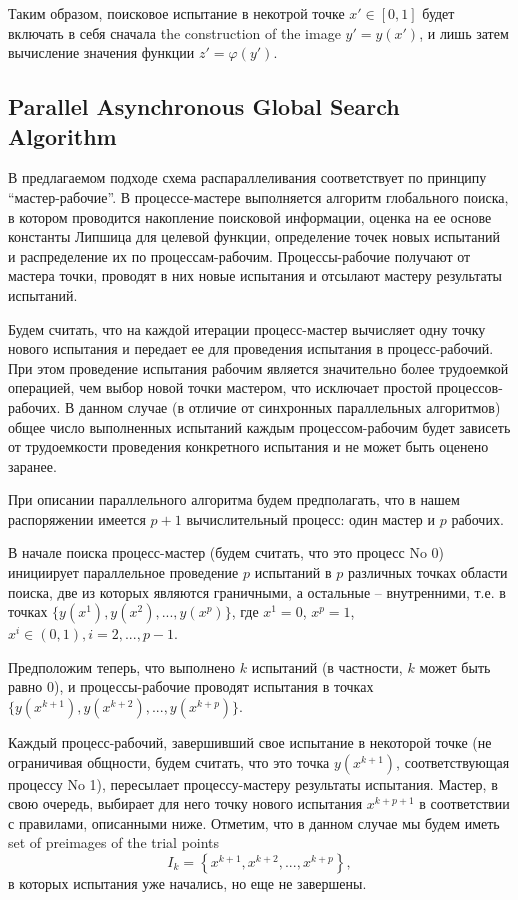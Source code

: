 \documentclass{svproc}
\begin{document}
Таким образом, поисковое испытание в некотрой точке $x'\in[0,1]$ будет включать в себя сначала the construction of the image $y'=y(x')$, и лишь затем вычисление значения функции $ z' = \varphi(y')$.

\subsection{Parallel Asynchronous Global Search Algorithm}

В предлагаемом подходе схема распараллеливания соответствует по принципу ``мастер-рабочие''. В процессе-мастере выполняется алгоритм глобального поиска, в котором проводится накопление поисковой информации, оценка на ее основе константы Липшица для целевой функции, определение точек новых испытаний и распределение их по процессам-рабочим. Процессы-рабочие получают от мастера точки, проводят в них новые испытания и отсылают мастеру результаты испытаний. 

Будем считать, что на каждой итерации процесс-мастер вычисляет одну точку нового испытания и передает ее для проведения испытания в процесс-рабочий. При этом проведение испытания рабочим является значительно более трудоемкой операцией, чем выбор новой точки мастером, что исключает простой процессов-рабочих. 
В данном случае (в отличие от синхронных параллельных алгоритмов) общее число выполненных испытаний каждым процессом-рабочим будет зависеть от трудоемкости проведения конкретного испытания и не может быть оценено заранее.

При описании параллельного алгоритма будем предполагать, что в нашем распоряжении имеется $p+1$ вычислительный процесс: один мастер и $p$ рабочих.
 
В начале поиска процесс-мастер (будем считать, что это процесс No 0) инициирует параллельное проведение $p$ испытаний в $p$ различных точках области поиска, две из которых являются граничными, а остальные -- внутренними, т.е. в точках $\{y(x^1), y(x^2), ...,y(x^p)\}$, где $x^1 = 0$, $x^p = 1$, $x^i\in(0,1), i=2,..., p-1$.

Предположим теперь, что выполнено $k$ испытаний (в частности, $k$ может быть равно 0), и процессы-рабочие проводят испытания в точках $\{y(x^{k+1}), y(x^{k+2}), ...,y(x^{k+p})\}$. 

Каждый процесс-рабочий, завершивший свое испытание в некоторой точке (не ограничивая общности, будем считать, что это точка $y(x^{k+1})$, соответствующая процессу No 1), пересылает процессу-мастеру результаты испытания. Мастер, в свою очередь, выбирает для него точку нового испытания $x^{k+p+1}$ в соответствии с правилами, описанными ниже.
Отметим, что в данном случае мы будем иметь set of preimages of the trial points
\[
I_k = \left\{ x^{k+1},x^{k+2},...,x^{k+p} \right\},
\]
в которых испытания уже начались, но еще не завершены.
\end{document}
